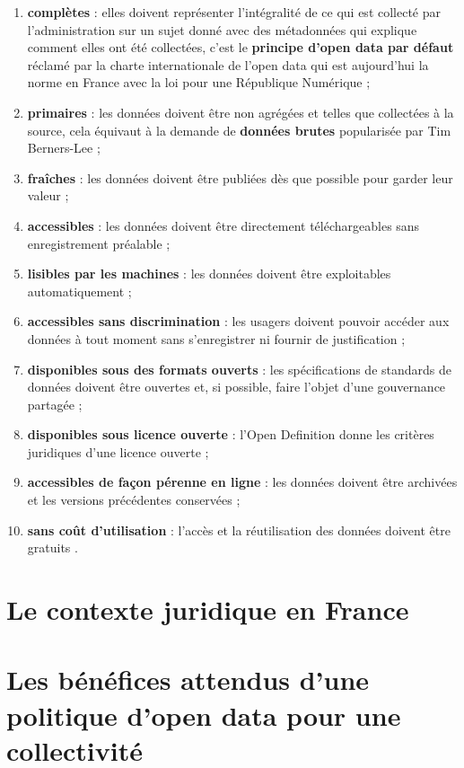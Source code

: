 \documentclass[]{book}
\theoremstyle{definition}
\theoremstyle{definition}
\theoremstyle{definition}
\theoremstyle{remark}
\begin{document}
\begin{enumerate}
\def\labelenumi{\arabic{enumi}.}
\item
  \textbf{complètes} : elles doivent représenter l'intégralité de ce qui
  est collecté par l'administration sur un sujet donné avec des
  métadonnées qui explique comment elles ont été collectées, c'est le
  \textbf{principe d'open data par défaut} réclamé par la charte
  internationale de l'open data qui est aujourd'hui la norme en France
  avec la loi pour une République Numérique ;
\item
  \textbf{primaires} : les données doivent être non agrégées et telles
  que collectées à la source, cela équivaut à la demande de
  \textbf{données brutes} popularisée par Tim Berners-Lee ;
\item
  \textbf{fraîches} : les données doivent être publiées dès que possible
  pour garder leur valeur ;
\item
  \textbf{accessibles} : les données doivent être directement
  téléchargeables sans enregistrement préalable ;
\item
  \textbf{lisibles par les machines} : les données doivent être
  exploitables automatiquement ;
\item
  \textbf{accessibles sans discrimination} : les usagers doivent pouvoir
  accéder aux données à tout moment sans s'enregistrer ni fournir de
  justification ;
\item
  \textbf{disponibles sous des formats ouverts} : les spécifications de
  standards de données doivent être ouvertes et, si possible, faire
  l'objet d'une gouvernance partagée ;
\item
  \textbf{disponibles sous licence ouverte} : l'Open Definition donne
  les critères juridiques d'une licence ouverte ;
\item
  \textbf{accessibles de façon pérenne en ligne} : les données doivent
  être archivées et les versions précédentes conservées ;
\item
  \textbf{sans coût d'utilisation} : l'accès et la réutilisation des
  données doivent être gratuits .
\end{enumerate}

\section{Le contexte juridique en
France}\label{le-contexte-juridique-en-france}

\section{Les bénéfices attendus d'une politique d'open data pour une
collectivité}\label{les-benefices-attendus-dune-politique-dopen-data-pour-une-collectivite}
\end{document}
